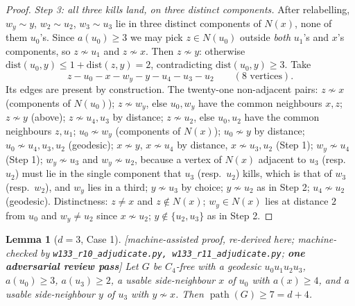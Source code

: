 \documentclass[11pt]{article}
\theoremstyle{plain}
\newtheorem{lemma}[theorem]{Lemma}
\theoremstyle{definition}
\theoremstyle{remark}
\numberwithin{equation}{section}
\newcommand{\pth}{\operatorname{path}}
\newcommand{\statusbox}[1]{{\small\sloppy\textsf{[#1]}}}
\newcommand{\AD}[1]{\statusbox{machine-assisted proof, re-derived here;
machine-checked by \texttt{#1}; \textbf{one adversarial review pass}}}
\begin{document}
\begin{proof}
\emph{Step 3: all three kills land, on three distinct components.} After relabelling,
$w_y \sim y$, $w_2 \sim u_2$, $w_3 \sim u_3$ lie in three distinct components of $N(x)$, none
of them $u_0$'s. Since $a(u_0)\ge 3$ we may pick $z \in N(u_0)$ outside \emph{both} $u_1$'s
and $x$'s components, so $z \not\sim u_1$ and $z\not\sim x$. Then $z \not\sim y$: otherwise
$\mathrm{dist}(u_0,y)\le 1 + \mathrm{dist}(z,y) = 2$, contradicting
$\mathrm{dist}(u_0,y)\ge 3$. Take
\[
  z - u_0 - x - w_y - y - u_4 - u_3 - u_2 \qquad (8 \text{ vertices}).
\]
Its edges are present by construction. The twenty-one non-adjacent pairs: $z \not\sim x$
(components of $N(u_0)$); $z\not\sim w_y$, else $u_0, w_y$ have the common neighbours $x,z$;
$z \not\sim y$ (above); $z \not\sim u_4, u_3$ by distance; $z \not\sim u_2$, else $u_0,u_2$
have the common neighbours $z,u_1$; $u_0 \not\sim w_y$ (components of $N(x)$);
$u_0 \not\sim y$ by distance; $u_0\not\sim u_4,u_3,u_2$ (geodesic); $x \not\sim y$,
$x\not\sim u_4$ by distance, $x\not\sim u_3,u_2$ (Step 1); $w_y \not\sim u_4$ (Step 1);
$w_y \not\sim u_3$ and $w_y \not\sim u_2$, because a vertex of $N(x)$ adjacent to $u_3$
(resp.\ $u_2$) must lie in the single component that $u_3$ (resp.\ $u_2$) kills, which is
that of $w_3$ (resp.\ $w_2$), and $w_y$ lies in a third; $y \not\sim u_3$ by choice;
$y \not\sim u_2$ as in Step 2; $u_4 \not\sim u_2$ (geodesic). Distinctness: $z \ne x$ and
$z \notin N(x)$; $w_y \in N(x)$ lies at distance $2$ from $u_0$ and $w_y \ne u_2$ since
$x \not\sim u_2$; $y \notin \{u_2,u_3\}$ as in Step 2.
\end{proof}

\begin{lemma}[$d = 3$, Case 1]\label{lem:g37}
\AD{w133\_r10\_adjudicate.py, w133\_r11\_adjudicate.py}
Let $G$ be $C_4$-free with a geodesic $u_0u_1u_2u_3$, $a(u_0)\ge 3$, $a(u_3)\ge 2$, a usable
side-neighbour $x$ of $u_0$ with $a(x)\ge 4$, \emph{and} a usable side-neighbour $y$ of $u_3$
with $y \not\sim x$. Then $\pth(G)\ge 7 = d+4$.
\end{lemma}
\end{document}

